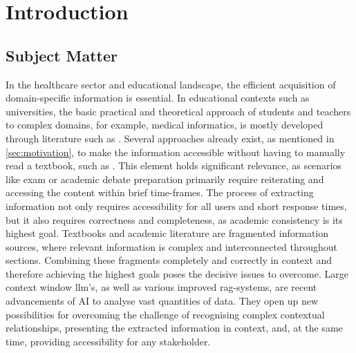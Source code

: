 \chapter{Introduction}\label{ch:introduction}
\section{Subject Matter}\label{sec:subject matter}
In the healthcare sector and educational landscape, the efficient acquisition of domain-specific information is essential. 
In educational contexts such as universities, the basic practical and theoretical approach of students and teachers to complex domains, for example, medical informatics, is mostly developed through literature such as \citet{bb2}.
%
Several approaches already exist, as mentioned in \cref{sec:motivation}, to make the information accessible without having to manually read a textbook, such as \citet{bb2}.
This element holds significant relevance, as scenarios like exam or academic debate preparation primarily require reiterating and accessing the content within brief time-frames.
%
The process of extracting information not only requires accessibility for all users and short response times, but it also requires correctness and completeness, as academic consistency is its highest goal. 
Textbooks and academic literature are fragmented information sources, where relevant information is complex and interconnected throughout sections. 
Combining these fragments completely and correctly in context and therefore achieving the highest goals poses the decisive issues to overcome. 
%
Large context window \ac{llm}'s, as well as various improved \ac{rag}-systems, are recent advancements of AI to analyse vast quantities of data.
They open up new possibilities for overcoming the challenge of recognising complex contextual relationships, presenting the extracted information in context, and, at the same time, providing accessibility for any stakeholder.

